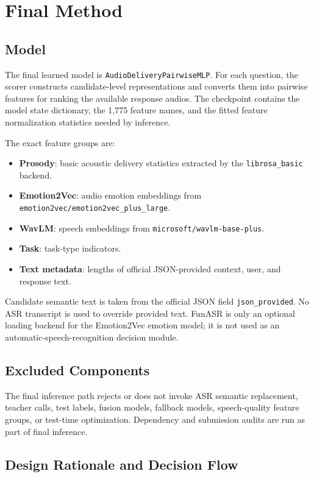 \documentclass[11pt]{article}
\begin{document}
\section{Final Method}

\subsection{Model}

The final learned model is \texttt{AudioDeliveryPairwiseMLP}. For each question,
the scorer constructs candidate-level representations and converts them into
pairwise features for ranking the available response audios. The checkpoint
contains the model state dictionary, the 1,775 feature names, and the fitted
feature normalization statistics needed by inference.

The exact feature groups are:

\begin{itemize}
  \item \textbf{Prosody}: basic acoustic delivery statistics extracted by the
  \texttt{librosa\_basic} backend.
  \item \textbf{Emotion2Vec}: audio emotion embeddings from
  \texttt{emotion2vec/emotion2vec\_plus\_large}.
  \item \textbf{WavLM}: speech embeddings from
  \texttt{microsoft/wavlm-base-plus}.
  \item \textbf{Task}: task-type indicators.
  \item \textbf{Text metadata}: lengths of official JSON-provided context,
  user, and response text.
\end{itemize}

Candidate semantic text is taken from the official JSON field
\texttt{json\_provided}. No ASR transcript is used to override provided text.
FunASR is only an optional loading backend for the Emotion2Vec emotion model;
it is not used as an automatic-speech-recognition decision module.

\subsection{Excluded Components}

The final inference path rejects or does not invoke ASR semantic replacement,
teacher calls, test labels, fusion models, fallback models, speech-quality
feature groups, or test-time optimization. Dependency and submission audits are
run as part of final inference.

\subsection{Design Rationale and Decision Flow}
\end{document}
